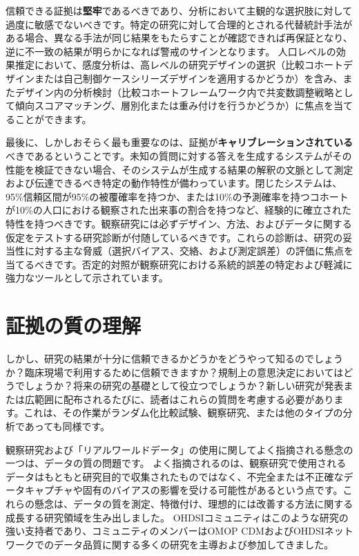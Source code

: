\documentclass[
  11pt]{book}
\theoremstyle{definition}
\theoremstyle{definition}
\theoremstyle{definition}
\theoremstyle{definition}
\theoremstyle{remark}
\begin{document}
信頼できる証拠は\textbf{堅牢}であるべきであり、分析において主観的な選択肢に対して過度に敏感でないべきです。特定の研究に対して合理的とされる代替統計手法がある場合、異なる手法が同じ結果をもたらすことが確認できれば再保証となり、逆に不一致の結果が明らかになれば警戒のサインとなります。\citep{madigan2013design} 人口レベルの効果推定において、感度分析は、高レベルの研究デザインの選択（比較コホートデザインまたは自己制御ケースシリーズデザインを適用するかどうか）を含み、またデザイン内の分析検討（比較コホートフレームワーク内で共変数調整戦略として傾向スコアマッチング、層別化または重み付けを行うかどうか）に焦点を当てることができます。

最後に、しかしおそらく最も重要なのは、証拠が\textbf{キャリブレーションされている}べきであるということです。未知の質問に対する答えを生成するシステムがその性能を検証できない場合、そのシステムが生成する結果の解釈の文脈として測定および伝達できるべき特定の動作特性が備わっています。閉じたシステムは、95\%信頼区間が95\%の被覆確率を持つか、または10\%の予測確率を持つコホートが10\%の人口における観察された出来事の割合を持つなど、経験的に確立された特性を持つべきです。観察研究には必ずデザイン、方法、およびデータに関する仮定をテストする研究診断が付随しているべきです。これらの診断は、研究の妥当性に対する主な脅威（選択バイアス、交絡、および測定誤差）の評価に焦点を当てるべきです。否定的対照が観察研究における系統的誤差の特定および軽減に強力なツールとして示されています。\citep{schuemie_2016, schuemie_2018, schuemie_2018b}

\section{証拠の質の理解}\label{ux8a3cux62e0ux306eux8ceaux306eux7406ux89e3}

しかし、研究の結果が十分に信頼できるかどうかをどうやって知るのでしょうか？臨床現場で利用するために信頼できますか？規制上の意思決定においてはどうでしょうか？将来の研究の基礎として役立つでしょうか？新しい研究が発表または広範囲に配布されるたびに、読者はこれらの質問を考慮する必要があります。これは、その作業がランダム化比較試験、観察研究、または他のタイプの分析であっても同様です。  

観察研究および「リアルワールドデータ」の使用に関してよく指摘される懸念の一つは、データの質の問題です。\citep{botsis2010secondary, hersh2013caveats, sherman2016real} よく指摘されるのは、観察研究で使用されるデータはもともと研究目的で収集されたものではなく、不完全または不正確なデータキャプチャや固有のバイアスの影響を受ける可能性があるという点です。これらの懸念は、データの質を測定、特徴付け、理想的には改善する方法に関する成長する研究領域を生み出しました。\citep{kahn2012pragmatic, liaw2013towards, weiskopf_2013} OHDSIコミュニティはこのような研究の強い支持者であり、コミュニティのメンバーはOMOP CDMおよびOHDSIネットワークでのデータ品質に関する多くの研究を主導および参加してきました。\citep{huser_multisite_2016, kahn_transparent_2015, callahan2017comparison, yoon_2016}  
\end{document}

